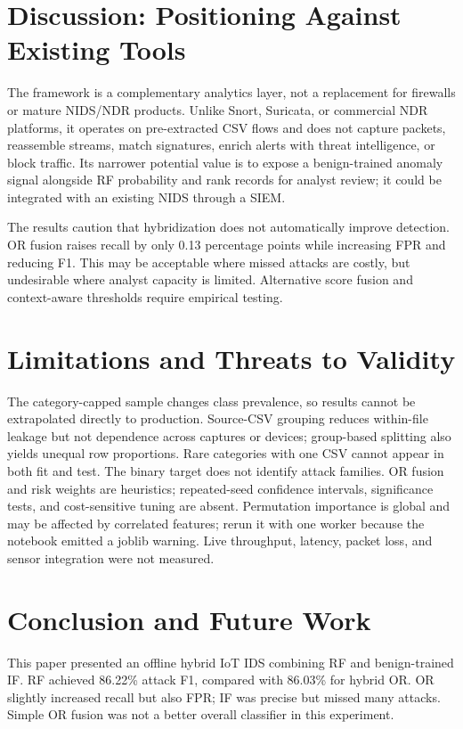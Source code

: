 \documentclass[runningheads]{llncs}
\begin{document}
\section{Discussion: Positioning Against Existing Tools}
The framework is a complementary analytics layer, not a replacement for firewalls or mature NIDS/NDR products. Unlike Snort, Suricata, or commercial NDR platforms, it operates on pre-extracted CSV flows and does not capture packets, reassemble streams, match signatures, enrich alerts with threat intelligence, or block traffic. Its narrower potential value is to expose a benign-trained anomaly signal alongside RF probability and rank records for analyst review; it could be integrated with an existing NIDS through a SIEM.

The results caution that hybridization does not automatically improve detection. OR fusion raises recall by only 0.13 percentage points while increasing FPR and reducing F1. This may be acceptable where missed attacks are costly, but undesirable where analyst capacity is limited. Alternative score fusion and context-aware thresholds require empirical testing.

\section{Limitations and Threats to Validity}
The category-capped sample changes class prevalence, so results cannot be extrapolated directly to production. Source-CSV grouping reduces within-file leakage but not dependence across captures or devices; group-based splitting also yields unequal row proportions. Rare categories with one CSV cannot appear in both fit and test. The binary target does not identify attack families. OR fusion and risk weights are heuristics; repeated-seed confidence intervals, significance tests, and cost-sensitive tuning are absent. Permutation importance is global and may be affected by correlated features; rerun it with one worker because the notebook emitted a joblib warning. Live throughput, latency, packet loss, and sensor integration were not measured.

\section{Conclusion and Future Work}
This paper presented an offline hybrid IoT IDS combining RF and benign-trained IF. RF achieved 86.22\% attack F1, compared with 86.03\% for hybrid OR. OR slightly increased recall but also FPR; IF was precise but missed many attacks. Simple OR fusion was not a better overall classifier in this experiment.
\end{document}
